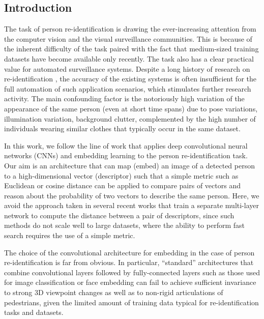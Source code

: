 \subsection{Introduction}





The task of person re-identification is drawing the ever-increasing attention from the computer vision and the visual surveillance communities. This is because of the inherent difficulty of the task paired with the fact that medium-sized training datasets have become available only recently. The task also has a clear practical value for automated surveillance systems.
Despite a long history of research on re-identification \citep{yi2014deep, ma2012bicov, DBLP:journals/cviu/BazzaniCM13, li2015cross,prosser2010person, kuo2013person,roth2014mahalanobis,hirzer2012person,paisitkriangkrai2015learning,ma2012local,liao2015person,li2014deepreid,ahmed2015improved,chen2015deep}, the accuracy of the existing systems is often insufficient for the full automation of such application scenarios, which stimulates further research activity. The main confounding factor is the notoriously high variation of the appearance of the same person (even at short time spans) due to pose variations, illumination variation, background clutter, complemented by the high number of individuals wearing similar clothes that typically occur in the same dataset.

In this work, we follow the line of work that applies deep convolutional neural networks (CNNs) and embedding learning to the person re-identification task. Our aim is an architecture that can map (embed) an image of a detected person to a high-dimensional vector (descriptor) such that a simple metric such as Euclidean or cosine distance can be applied to compare pairs of vectors and reason about the probability of two vectors to describe the same person. Here, we avoid the approach taken in several recent works \citep{ahmed2015improved} that train a separate multi-layer network to compute the distance between a pair of descriptors, since such methods do not scale well to large datasets, where the ability to perform fast search requires the use of a simple metric.

The choice of the convolutional architecture for embedding in the case of person re-identification is far from obvious. In particular, ``standard'' architectures that combine convolutional layers followed by fully-connected layers such as those used for image classification or face embedding can fail to achieve sufficient invariance to strong 3D viewpoint changes as well as to non-rigid articulations of pedestrians, given the limited amount of training data typical for re-identification tasks and datasets. 

